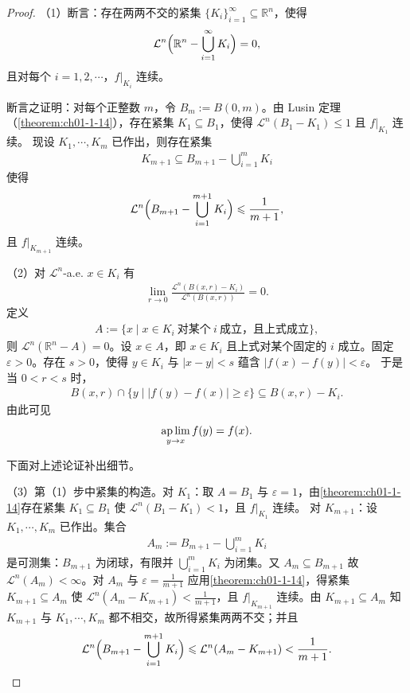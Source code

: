 \documentclass[../../main.tex]{subfiles}%
\begin{document}
\begin{proof}
（1）断言：存在两两不交的紧集 $\{K_i\}_{i=1}^{\infty}\subseteq\mathbb{R}^n$，使得
\begin{align*}
\mathcal{L}^{n}\Bigl(\mathbb{R}^n-\bigcup_{i=1}^{\infty}K_i\Bigr)=0 ,
\end{align*}
且对每个 $i=1,2,\cdots$，$f|_{K_i}$ 连续。

断言之证明：对每个正整数 $m$，令 $B_m:=B(0,m)$。由 Lusin 定理（\cref{theorem:ch01-1-14}），存在紧集 $K_1\subseteq B_1$，使得 $\mathcal{L}^{n}(B_1-K_1)\leqslant1$ 且 $f|_{K_1}$ 连续。%
现设 $K_1,\cdots,K_m$ 已作出，则存在紧集
\begin{align*}
K_{m+1}\subseteq B_{m+1}-\bigcup_{i=1}^{m}K_i
\end{align*}
使得
\begin{align*}
\mathcal{L}^{n}\Bigl(B_{m+1}-\bigcup_{i=1}^{m+1}K_i\Bigr)\leqslant\frac{1}{m+1} ,
\end{align*}
且 $f|_{K_{m+1}}$ 连续。

（2）对 $\mathcal{L}^{n}$-a.e. $x\in K_i$ 有
\begin{align*}
\lim_{r\to0}\frac{\mathcal{L}^{n}(B(x,r)-K_i)}{\mathcal{L}^{n}(B(x,r))}=0 .
\end{align*}
定义
\begin{align*}
A:=\{x\mid x\in K_i\ \text{对某个}\ i\ \text{成立，且上式成立}\},
\end{align*}
则 $\mathcal{L}^{n}(\mathbb{R}^n-A)=0$。设 $x\in A$，即 $x\in K_i$ 且上式对某个固定的 $i$ 成立。固定 $\varepsilon>0$。存在 $s>0$，使得 $y\in K_i$ 与 $\lvert x-y\rvert<s$ 蕴含 $\lvert f(x)-f(y)\rvert<\varepsilon$。
于是当 $0<r<s$ 时，
\begin{align*}
B(x,r)\cap\{y\mid\lvert f(y)-f(x)\rvert\geqslant\varepsilon\}\subseteq B(x,r)-K_i .
\end{align*}
由此可见
\begin{align*}
\operatorname*{ap\,lim}_{y\to x}f(y)=f(x) .
\end{align*}

下面对上述论证补出细节。

（3）第（1）步中紧集的构造。对 $K_1$：取 $A=B_1$ 与 $\varepsilon=1$，由\cref{theorem:ch01-1-14}存在紧集 $K_1\subseteq B_1$ 使 $\mathcal{L}^{n}(B_1-K_1)<1$，且 $f|_{K_1}$ 连续。%
对 $K_{m+1}$：设 $K_1,\cdots,K_m$ 已作出。集合
\begin{align*}
A_m:=B_{m+1}-\bigcup_{i=1}^{m}K_i
\end{align*}
是可测集：$B_{m+1}$ 为闭球，有限并 $\bigcup_{i=1}^{m}K_i$ 为闭集。又 $A_m\subseteq B_{m+1}$ 故 $\mathcal{L}^{n}(A_m)<\infty$。对 $A_m$ 与 $\varepsilon=\frac{1}{m+1}$ 应用\cref{theorem:ch01-1-14}，得紧集 $K_{m+1}\subseteq A_m$ 使 $\mathcal{L}^{n}(A_m-K_{m+1})<\frac{1}{m+1}$，且 $f|_{K_{m+1}}$ 连续。由 $K_{m+1}\subseteq A_m$ 知 $K_{m+1}$ 与 $K_1,\cdots,K_m$ 都不相交，故所得紧集两两不交；并且%
\begin{align*}
\mathcal{L}^{n}\Bigl(B_{m+1}-\bigcup_{i=1}^{m+1}K_i\Bigr)\leqslant\mathcal{L}^{n}(A_m-K_{m+1})<\frac{1}{m+1} .
\end{align*}


\end{proof}
\end{document}

